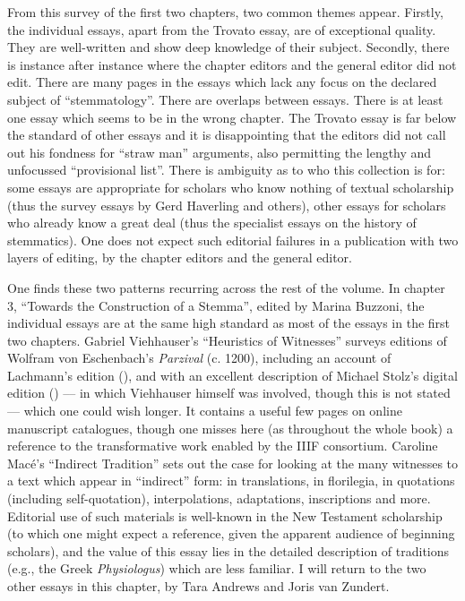 \begin{review}
From this survey of the first two chapters, two common themes
appear. Firstly, the individual essays, apart from the Trovato essay,
are of exceptional quality. They are well-written and show deep
knowledge of their subject. Secondly, there is instance after instance
where the chapter editors and the general editor did not edit. There are
many pages in the essays which lack any focus on the declared subject of
``stemmatology''. There are overlaps between essays. There is at least
one essay which seems to be in the wrong chapter. The Trovato essay is
far below the standard of other essays and it is disappointing that the
editors did not call out his fondness for ``straw man'' arguments, also
permitting the lengthy and unfocussed ``provisional list''. There is
ambiguity as to who this collection is for: some essays are appropriate
for scholars who know nothing of textual scholarship (thus the survey
essays by Gerd Haverling and others), other essays for scholars who
already know a great deal (thus the specialist essays on the history of
stemmatics). One does not expect such editorial failures in a
publication with two layers of editing, by the chapter editors and the
general editor.

One finds these two patterns recurring across the rest of the
volume. In chapter 3, ``Towards the Construction of a Stemma'', edited
by Marina Buzzoni, the individual essays are at the same high standard
as most of the essays in the first two chapters. Gabriel Viehhauser's
``Heuristics of Witnesses'' surveys editions of Wolfram von Eschenbach's
\emph{Parzival} (c. 1200), including an account of Lachmann's edition
(\citeyear{von_eschenbach_wolfram_1833}), and with an excellent description of Michael Stolz's digital
edition (\citeyear{von_eschenbach_parzival-projekt_2022}) –– in which Viehhauser himself was involved, though this
is not stated –– which one could wish longer. It contains a useful few
pages on online manuscript catalogues, though one misses here (as
throughout the whole book) a reference to the transformative work
enabled by the IIIF consortium. Caroline Macé's ``Indirect Tradition''
sets out the case for looking at the many witnesses to a text which
appear in ``indirect'' form: in translations, in florilegia, in
quotations (including self-quotation), interpolations, adaptations,
inscriptions and more. Editorial use of such materials is well-known in
the New Testament scholarship (to which one might expect a reference,
given the apparent audience of beginning scholars), and the value of
this essay lies in the detailed description of traditions (e.g., the
Greek \emph{Physiologus}) which are less familiar. I will return to the
two other essays in this chapter, by Tara Andrews and Joris van Zundert.


\end{review}

